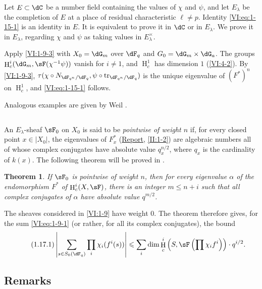 \documentclass[12pt,oneside,english]{smfbook}
\DeclareMathOperator{\h}{H}
\DeclareMathOperator{\tr}{tr}
\newcounter{char}
\newtheorem{theorem_}[subsection]{Theorem}
\begin{document}
Let $E\subset\dC$ be a number field containing the values of $\chi$ and $\psi$, and let $E_\lambda$ be the completion of $E$ at a place of residual characteristic $\ell\ne p$. Identity \eqref{VI:eq:1-15-1} is an identity in $E$. It is equivalent to prove it in $\dC$ or in $E_\lambda$. We prove it in $E_\lambda$, regarding $\chi$ and $\psi$ as taking values in $E_\lambda^\times$.

Apply \ref{VI:1-9-3} with $X_0=\dG_m$ over $\dF_q$ and $G_0=\dG_m\times\dG_a$. The groups $\h_c^i(\dG_m,\sF(\chi^{-1}\psi))$ vanish for $i\ne1$, and $\h_c^1$ has dimension $1$ (\ref{VI:4-2}). By \ref{VI:1-9-3}, $\tau(\chi\circ N_{\dF_{q^n}/\dF_q}, \psi\circ\tr_{\dF_{q^n}/\dF_q})$ is the unique eigenvalue of $(F^\ast)^n$ on $\h_c^1$, and \eqref{VI:eq:1-15-1} follows.

Analogous examples are given by Weil \cite[App.\ V]{we74}.

\subsection{}\label{VI:1-16}

An $E_\lambda$-sheaf $\sF_0$ on $X_0$ is said to be \emph{pointwise of weight $n$} if, for every closed point $x\in|X_0|$, the eigenvalues of $F_x^\ast$ (\hyperref[II]{Report}, \ref{II:1-2}) are algebraic numbers all of whose complex conjugates have absolute value $q_x^{n/2}$, where $q_x$ is the cardinality of $k(x)$. The following theorem will be proved in \cite{de80}.

\begin{theorem_}\label{VI:1-17}
If $\sF_0$ is pointwise of weight $n$, then for every eigenvalue $\alpha$ of the endomorphism $F^\ast$ of $\h_c^i(X,\sF)$, there is an integer $m\leqslant n+i$ such that all complex conjugates of $\alpha$ have absolute value $q^{m/2}$.
\end{theorem_}

The sheaves considered in \ref{VI:1-9} have weight $0$. The theorem therefore gives, for the sum \ref{VI:eq:1-9-1} (or rather, for all its complex conjugates), the bound
\begin{equation*}\tag{1.17.1}\label{VI:eq:1-17-1}
  \left|\sum_{s\in S_0(\dF_q)} \prod_i \chi_i(f^i(s)) \right| \leqslant \sum_i \dim \h_c^i\left(S,\sF\left(\prod \chi_i f^i\right)\right)\cdot q^{i/2} \text{.}
\end{equation*}

\subsection{Remarks}\label{VI:1-18}
\end{document}

